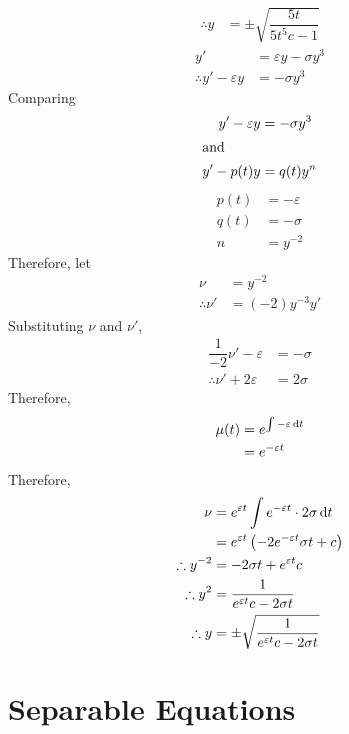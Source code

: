 \documentclass[fleqn, a4paper, 12pt, oneside]{amsart}
\theoremstyle{definition}
\theoremstyle{theorem}
\begin{document}
\begin{solution}
\begin{tasks}
\begin{align*}
				\therefore y &= \pm \sqrt{\dfrac{5t}{5t^5 c - 1}}
			\end{align*}
		\task
			\begin{align*}
				y' &= \varepsilon y - \sigma y^3\\
				\therefore y' - \varepsilon y &= - \sigma y^3
			\end{align*}
			Comparing
			\begin{align*}
				y' - \varepsilon y &= - \sigma y^3\\
				\intertext{and}
				y' - p(t) y &= q(t) y^n
			\end{align*}
			\begin{align*}
				p(t) &= - \varepsilon\\
				q(t) &= -\sigma\\
				n &= y^{-2}
			\end{align*}
			Therefore, let
			\begin{align*}
				\nu &= y^{-2}\\
				\therefore \nu' &= (-2) y^{-3} y'
			\end{align*}
			Substituting $\nu$ and $\nu'$,
			\begin{align*}
				\dfrac{1}{-2} \nu' - \varepsilon &= -\sigma\\
				\therefore \nu' + 2 \varepsilon &= 2 \sigma
			\end{align*}
			Therefore,
			\begin{align*}
				\mu(t) &= e^{\int -\varepsilon \dif t}\\
				&= e^{-\varepsilon t}
			\end{align*}
			Therefore,
			\begin{align*}
				\nu &= e^{\varepsilon t} \int e^{-\varepsilon t} \cdot 2 \sigma \dif t\\
				&= e^{\varepsilon t} \left( -2e^{-\varepsilon t} \sigma t + c \right)\\
				\therefore y^{-2} &= -2 \sigma t + e^{\varepsilon t} c\\
				\therefore y^2 &= \dfrac{1}{e^{\varepsilon t} c - 2 \sigma t}\\
				\therefore y &= \pm \sqrt{\dfrac{1}{e^{\varepsilon t} c - 2 \sigma t}}
			\end{align*}
	\end{tasks}
\end{solution}

\part{Separable Equations}
\end{document}
